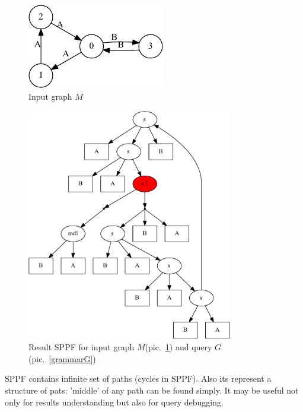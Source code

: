 \documentclass{sig-alternate} %
\begin{document}
\begin{figure}[h]
    \begin{center}
        \includegraphics[width=6cm]{dot/input.pdf}
        \caption{Input graph $M$}
        \label{input}        
    \end{center}
\end{figure}

\begin{figure}[h]
    \begin{center}
        \includegraphics[width=9cm]{dot/AnBn.pdf}
        \caption{Result SPPF for input graph $M$(pic.~\ref{input}) and query $G$(pic.~\ref{grammarG})}
        \label{SPPF}        
    \end{center}
\end{figure}


SPPF contains infinite set of paths (cycles in SPPF). Also its represent a structure of pats: 'middle' of any path can be found 
simply. It may be useful not only for results understanding but also for query debugging. 

\end{document}
